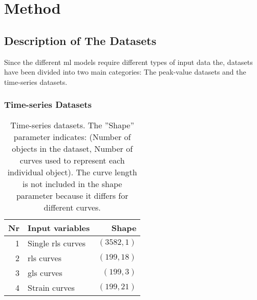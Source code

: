 \chapter{Method} \label{chap:method}

\section{Description of The Datasets} \label{sec:datasets}

Since the different \acrshort{ml} models require different types of input data the, datasets have been divided into two main categories: 
The peak-value datasets and the time-series datasets. \bigskip

\subsection{Time-series Datasets} \label{sec:ts_dsets}

\begin{table*}[h]
    \centering
    \begin{tabular}{ rlr }
        \toprule
        Nr & Input variables   & Shape \\
        \midrule
        1  & Single \acrshort{rls} curves & $(3582,1)$ \\
        2  & \acrshort{rls} curves        & $(199,18)$ \\
        3  & \acrshort{gls} curves        & $(199,3)$  \\
        4  & Strain curves                & $(199,21)$ \\
        \bottomrule
    \end{tabular}
    \caption{Time-series datasets. The ''Shape'' parameter indicates: (Number of objects in the dataset, Number of curves used to represent each individual object). The curve length is not included in the shape parameter because it differs for different curves.}
    \label{tab:ts_dsets}
\end{table*}

